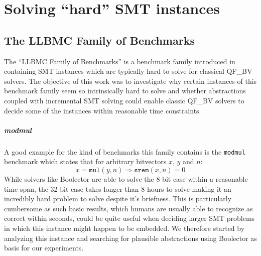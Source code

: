 \chapter{Solving \enquote{hard} SMT instances}
\label{ch:solving_hard_smt}
\section{The LLBMC Family of Benchmarks}
\label{sec:solving_hard_smt:llbmc_benchmarks}
The \enquote{LLBMC Family of Benchmarks} is a benchmark family introduced in \cite{sc2017-proceedings} containing SMT instances which are typically hard to solve for classical QF\_BV solvers. The objective of this work was to investigate why certain instances of this benchmark family seem so intrinsically hard to solve and whether abstractions coupled with incremental SMT solving could enable classic QF\_BV solvers to decide some of the instances within reasonable time constraints.

\paragraph{modmul}
A good example for the kind of benchmarks this family contains is the \texttt{modmul} benchmark which states that for arbitrary bitvectors $x$, $y$ and $n$:
\[
x = \texttt{mul}\left(y,n\right) \Rightarrow \texttt{srem}\left(x,n\right) = 0
\]
While solvers like Boolector are able to solve the 8 bit case within a reasonable time span, the 32 bit case takes longer than 8 hours to solve making it an incredibly hard problem to solve despite it's briefness. This is particularly cumbersome as such basic results, which humans are usually able to recognize as correct within seconds, could be quite useful when deciding larger SMT problems in which this instance might happen to be embedded. We therefore started by analyzing this instance and searching for plausible abstractions using Boolector as basis for our experiments.

